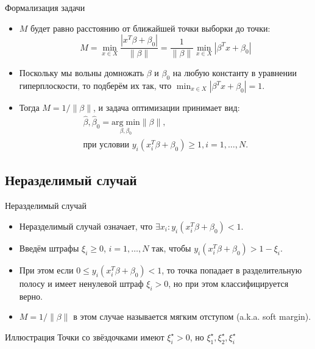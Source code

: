 \documentclass[9pt]{beamer}
\begin{document}
\begin{frame}{Формализация задачи}
    \begin{itemize}
        \item $M$ будет равно расстоянию от ближайшей точки выборки до точки:
        $$M = \min_{x\in X}\frac{|x^T\beta + \beta_0|}{\|\beta\|} = \frac{1}{\|\beta\|}\min_{x\in X}|\beta^Tx + \beta_0|$$
        \item Поскольку мы вольны домножать $\beta$ и $\beta_0$ на любую константу в уравнении гиперплоскости, то подберём их так, что $\min_{x\in X}|\beta^Tx + \beta_0| = 1$.
        \item Тогда $M = 1/\|\beta\|$, и задача оптимизации принимает вид:
        \begin{equation}
        \begin{gathered}
            \hat\beta, \hat\beta_0 = \underset{\beta,\beta_0}{\mathrm{arg\;min}} \|\beta\|,\\ \text{при условии } y_i(x_i^T\beta+\beta_0) \geq 1, i=1,\ldots,N.
        \end{gathered}
        \end{equation}
    \end{itemize}
\end{frame}

\subsection{Неразделимый случай}

\begin{frame}{Неразделимый случай}
    \begin{itemize}
        \item Неразделимый случай означает, что $\exists x_i: y_i(x_i^T\beta+\beta_0) < 1$.
        \item Введём штрафы $\xi_i \geq 0$, $i=1,\ldots,N$ так, чтобы $y_i(x_i^T\beta+\beta_0) > 1 - \xi_i$.
        \item При этом если $0 \leq y_i(x_i^T\beta+\beta_0) < 1$, то точка попадает в разделительную полосу и имеет ненулевой штраф $\xi_i > 0$, но при этом классифицируется верно.
        \item $M = 1/\|\beta\|$ в этом случае называется мягким отступом (a.k.a. soft margin).
    \end{itemize}
\end{frame}

\begin{frame}{Иллюстрация}
    Точки со звёздочками имеют $\xi^\star_i > 0$, но $\xi^\star_1, \xi^\star_2, \xi^\star_i$
\end{frame}
\end{document}
